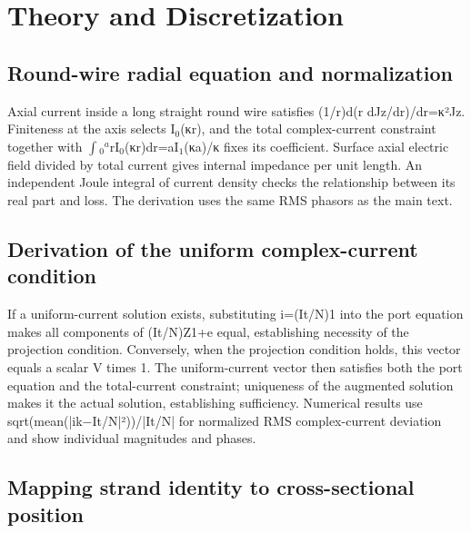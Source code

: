 \appendices
\section{Theory and Discretization}
\label{chapter:S1}

\hypertarget{S1.round_derivation.heading}{}
\subsection{Round-wire radial equation and normalization}

\hypertarget{S1.round_derivation.p1}{}
Axial current inside a long straight round wire satisfies (1/r)d(r dJz/dr)/dr=κ²Jz. Finiteness at the axis selects I\(_0\)(κr), and the total complex-current constraint together with \(\int\)\(_0\)\(^a\)rI\(_0\)(κr)dr=aI\(_1\)(κa)/κ fixes its coefficient. Surface axial electric field divided by total current gives internal impedance per unit length. An independent Joule integral of current density checks the relationship between its real part and loss. The derivation uses the same RMS phasors as the main text.

\hypertarget{S1.sharing_derivation.heading}{}
\subsection{Derivation of the uniform complex-current condition}

\hypertarget{S1.sharing_derivation.p1}{}
If a uniform-current solution exists, substituting i=(It/N)1 into the port equation makes all components of (It/N)Z1+e equal, establishing necessity of the projection condition. Conversely, when the projection condition holds, this vector equals a scalar V times 1. The uniform-current vector then satisfies both the port equation and the total-current constraint; uniqueness of the augmented solution makes it the actual solution, establishing sufficiency. Numerical results use sqrt(mean(|ik−It/N|²))/|It/N| for normalized RMS complex-current deviation and show individual magnitudes and phases.

\hypertarget{S1.dtm_derivation.heading}{}
\subsection{Mapping strand identity to cross-sectional position}

